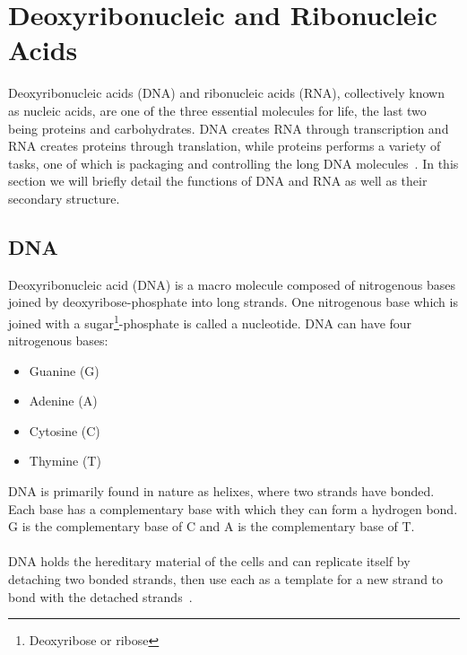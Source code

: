\section{Deoxyribonucleic and Ribonucleic Acids}
Deoxyribonucleic acids (DNA) and ribonucleic acids (RNA), collectively known as 
nucleic acids, are one of the three 
essential molecules for life, the last two being proteins and carbohydrates. 
DNA creates RNA through transcription and RNA creates proteins through 
translation, while proteins performs a variety of tasks, one 
of which is packaging and controlling the long DNA molecules~\cite[p. 172]{alberts}. 
In this section we will briefly detail the functions of DNA and RNA as well as their 
secondary structure.
\subsection{DNA}
Deoxyribonucleic acid (DNA) is a macro molecule composed of nitrogenous bases 
joined by deoxyribose-phosphate into long strands. One nitrogenous base which 
is joined with a sugar\footnote{Deoxyribose or ribose}-phosphate is called a 
nucleotide. DNA can have four nitrogenous bases:
\begin{itemize}
\item Guanine (G)
\item Adenine (A)
\item Cytosine (C)
\item Thymine (T)
\end{itemize}
DNA is primarily found in nature as helixes, where two strands have bonded. Each 
base has a complementary base with which they can form a hydrogen bond. 
G is the complementary base of C and A is the complementary base of T.\\\\
DNA holds the hereditary material of the cells and can replicate itself by 
detaching two bonded strands, then use each as a template for a new strand 
to bond with the detached strands~\cite[p. 199]{alberts}.
